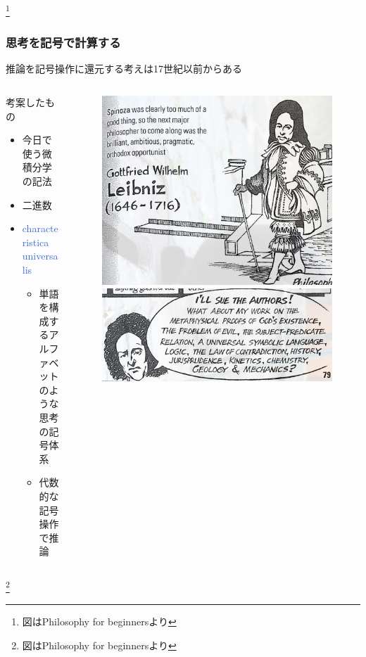 \documentclass[unicode, 14pt, aspectratio=169]{beamer}
\newcommand\blfootnote[1]{%
  \begingroup
  \renewcommand\thefootnote{}\footnote{#1}%
  \addtocounter{footnote}{-1}%
  \endgroup
}
\begin{document}
\begin{frame}
\begin{columns}
\begin{column}{0.2\textwidth}
\begin{figure}
      \end{figure}       
    \end{column} 
  \end{columns}
  \blfootnote{図はPhilosophy for beginners\supercite{philosophy-for-begginers}より}
\end{frame}
\begin{frame}
  \frametitle{思考を記号で計算する}
  {\large 推論を記号操作に還元する考えは17世紀以前からある}  
  \begin{columns}
    \begin{column}{0.55\textwidth}
      考案したもの
      \begin{itemize}
        \item 今日で使う微積分学の記法
        \item 二進数
        \item \textcolor{highlight}{characteristica universalis}
          \begin{itemize}
          \item 単語を構成するアルファベットのような思考の記号体系
          \item 代数的な記号操作で推論
          \end{itemize}
      \end{itemize}
    \end{column}    
    \begin{column}{0.4\textwidth}
      \begin{figure}
        \includegraphics[width=0.7\linewidth]{images/leibniz.png}
        \includegraphics[width=0.7\linewidth]{images/universal.png}
      \end{figure}       
    \end{column} 
  \end{columns}
  \blfootnote{図はPhilosophy for beginners\supercite{philosophy-for-begginers}より}  
\end{frame}
\end{document}
